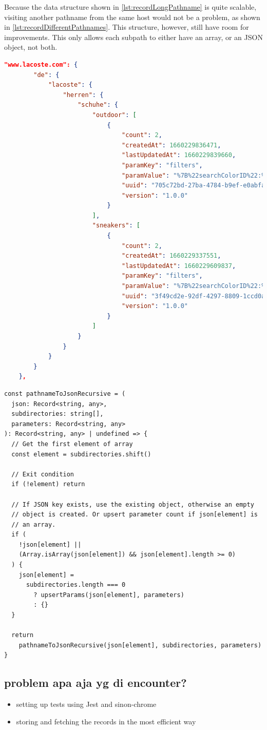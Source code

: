Because the data structure shown in \autoref{lst:recordLongPathname} is quite scalable, visiting another pathname from the same host would not be a problem, as shown in \autoref{lst:recordDifferentPathnames}. This structure, however, still have room for improvements. This only allows each subpath to either have an array, or an JSON object, not both.

\begin{lstlisting}[language=json, caption={Record with different pathnames (JSON)}, label={lst:recordDifferentPathnames}]
  "www.lacoste.com": {
		"de": {
			"lacoste": {
				"herren": {
					"schuhe": {
						"outdoor": [
							{
								"count": 2,
								"createdAt": 1660229836471,
								"lastUpdatedAt": 1660229839660,
								"paramKey": "filters",
								"paramValue": "%7B%22searchColorID%22:%22Schwarz%22%7D",
								"uuid": "705c72bd-27ba-4784-b9ef-e0abfa6476a6",
								"version": "1.0.0"
							}
						],
						"sneakers": [
							{
								"count": 2,
								"createdAt": 1660229337551,
								"lastUpdatedAt": 1660229609837,
								"paramKey": "filters",
								"paramValue": "%7B%22searchColorID%22:%22Schwarz%22%7D",
								"uuid": "3f49cd2e-92df-4297-8809-1ccd0a7a8e89",
								"version": "1.0.0"
							}
						]
					}
				}
			}
		}
	},
\end{lstlisting}

\begin{lstlisting}[style=ES6, caption={Resursive pathname to JSON function (TypeScript)}]
const pathnameToJsonRecursive = (
  json: Record<string, any>,
  subdirectories: string[],
  parameters: Record<string, any>
): Record<string, any> | undefined => {
  // Get the first element of array
  const element = subdirectories.shift()

  // Exit condition
  if (!element) return

  // If JSON key exists, use the existing object, otherwise an empty
  // object is created. Or upsert parameter count if json[element] is
  // an array.
  if (
    !json[element] ||
    (Array.isArray(json[element]) && json[element].length >= 0)
  ) {
    json[element] =
      subdirectories.length === 0
        ? upsertParams(json[element], parameters)
        : {}
  }

  return
    pathnameToJsonRecursive(json[element], subdirectories, parameters)
}
\end{lstlisting}

\subsection*{problem apa aja yg di encounter?}
\begin{itemize}
  \item setting up tests using Jest and sinon-chrome
  \item storing and fetching the records in the most efficient way
\end{itemize}

